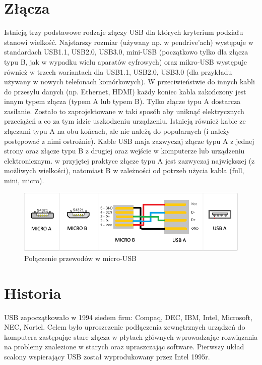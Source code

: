 \documentclass{BscUS}
\begin{document}
\section{Złącza}
Istnieją trzy podstawowe rodzaje złączy USB dla których kryterium podziału stanowi wielkość. Najstarszy rozmiar (używany np. w pendrive'ach) występuje w standardach USB1.1, USB2.0, USB3.0, mini-USB (początkowo tylko dla złącza typu B, jak w wypadku wielu aparatów cyfrowych) oraz mikro-USB występuje również w trzech wariantach dla USB1.1, USB2.0, USB3.0 (dla przykładu używany w nowych telefonach komórkowych). 
\newline
W przeciwieństwie do innych kabli do przesyłu danych (np. Ethernet, HDMI) każdy koniec kabla zakończony jest innym typem złącza (typem A lub typem B). Tylko złącze typu A dostarcza zasilanie. Zostało to zaprojektowane w taki sposób aby uniknąć elektrycznych przeciążeń a co za tym idzie uszkodzeniu urządzeniu. Istnieją również kable ze złączami typu A na obu końcach, ale nie należą do popularnych (i należy postępować z nimi ostrożnie). Kable USB maja zazwyczaj złącze typu A z jednej strony oraz złącze typu B z drugiej oraz wejście w komputerze lub urządzeniu elektronicznym. w przyjętej praktyce złącze typu A jest zazwyczaj największej (z możliwych wielkości), natomiast B w zależności od potrzeb użycia kabla (full, mini, micro). \cite{USBSystemArch, USB20Doc, USB30Doc}

\begin{figure}[h]
\centering
\includegraphics[width=15cm]{./img/micro-usb-type}
\caption{Połączenie przewodów w micro-USB}
\end{figure}

%
%
\section{Historia}
USB zapoczątkowało w 1994 siedem firm: Compaq, DEC, IBM, Intel, Microsoft, NEC, Nortel. Celem było uproszczenie podłączenia zewnętrznych urządzeń do komputera zastępując stare złącza w płytach głównych wprowadzając rozwiązania na problemy znalezione w starych oraz upraszczając software.
Pierwszy układ scalony wspierający USB został wyprodukowany przez Intel 1995r.
\newline
\end{document}
